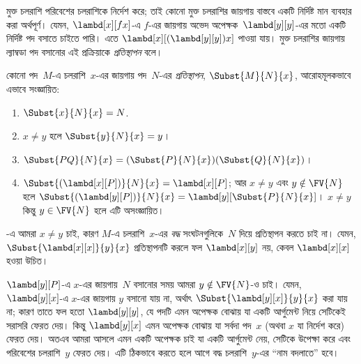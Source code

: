 \documentclass[../../../include/open-logic-section]{subfiles}
\begin{document}

\begin{explain}
মুক্ত চলরাশি পরিবেশের চলরাশিকে নির্দেশ করে; তাই কোনো মুক্ত চলরাশির
জায়গায় বাস্তবে একটি নির্দিষ্ট মান ব্যবহার করা অর্থপূর্ণ। যেমন,
$\lambd[x][f x]$-এ $f$-এর জায়গায় অভেদ অপেক্ষক~$\lambd[y][y]$-এর
মতো একটি নির্দিষ্ট পদ বসাতে চাইতে পারি। এতে
$\lambd[x][(\lambd[y][y]) x]$ পাওয়া যায়। মুক্ত চলরাশির জায়গায়
ল্যাম্বডা পদ বসানোর এই প্রক্রিয়াকে \emph{প্রতিস্থাপন} বলে।
\end{explain}

\begin{defn}[প্রতিস্থাপন] 
  কোনো পদ~$M$-এ চলরাশি~$x$-এর জায়গায় পদ~$N$-এর
  \emph{প্রতিস্থাপন}, $\Subst{M}{N}{x}$, আরোহমূলকভাবে এভাবে সংজ্ঞায়িত:
  \begin{enumerate}
    \item $\Subst{x}{N}{x} = N$. 
    \item $x \neq y$ হলে $\Subst{y}{N}{x}  = y$। 
    \item $\Subst{PQ}{N}{x}  = (\Subst{P}{N}{x}) (\Subst{Q}{N}{x})$।
    \item $\Subst{(\lambd[x][P])}{N}{x} = \lambd[x][P]$; আর
      $x \neq y$ এবং $y \notin \FV{N}$ হলে
      $\Subst{(\lambd[y][P])}{N}{x} = \lambd[y][\Subst{P}{N}{x}]$।
      $x \neq y$ কিন্তু $y \in \FV{N}$ হলে এটি অসংজ্ঞায়িত।
  \end{enumerate}
\end{defn}

\begin{explain}
-এ আমরা $x \neq y$
চাই, কারণ $M$-এ চলরাশি~$x$-এর \emph{বদ্ধ} সংঘটনগুলিকে~$N$ দিয়ে
প্রতিস্থাপন করতে চাই না। যেমন,
$\Subst{\lambd[x][x]}{y}{x}$ প্রতিস্থাপনটি করলে ফল
$\lambd[x][y]$ নয়, কেবল $\lambd[x][x]$ হওয়া উচিত।

$\lambd[y][P]$-এ $x$-এর জায়গায়~$N$ বসানোর সময় আমরা
$y \notin \FV{N}$-ও চাই। যেমন, $\lambd[y][x]$-এ $x$-এর জায়গায়
$y$ বসানো যায় না, অর্থাৎ $\Subst{\lambd[y][x]}{y}{x}$ করা যায় না;
কারণ তাতে ফল হতো $\lambd[y][y]$, যে পদটি এমন অপেক্ষক বোঝায় যা একটি
আর্গুমেন্ট নিয়ে সেটিকেই সরাসরি ফেরত দেয়। কিন্তু $\lambd[y][x]$
এমন অপেক্ষক বোঝায় যা সর্বদা পদ~$x$ (অথবা $x$ যা নির্দেশ করে) ফেরত
দেয়। অতএব আমরা আসলে এমন একটি অপেক্ষক চাই যা একটি আর্গুমেন্ট নেয়,
সেটিকে উপেক্ষা করে এবং পরিবেশের চলরাশি~$y$ ফেরত দেয়। এটি ঠিকভাবে
করতে হলে আগে বদ্ধ চলরাশি~$y$-এর ``নাম বদলাতে'' হবে।
\end{explain}
\end{document}
